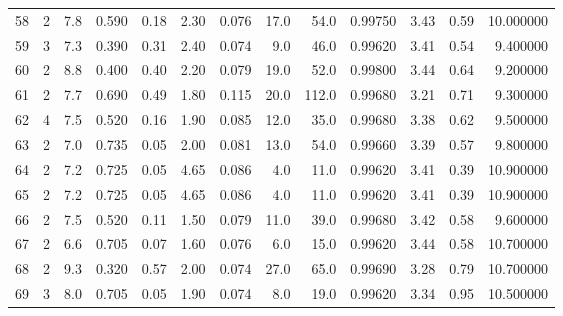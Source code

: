 \begin{tabular}{lrrrrrrrrrrrr}
58   &        2 &            7.8 &             0.590 &         0.18 &            2.30 &      0.076 &                 17.0 &                  54.0 &  0.99750 &  3.43 &       0.59 &  10.000000 \\
59   &        3 &            7.3 &             0.390 &         0.31 &            2.40 &      0.074 &                  9.0 &                  46.0 &  0.99620 &  3.41 &       0.54 &   9.400000 \\
60   &        2 &            8.8 &             0.400 &         0.40 &            2.20 &      0.079 &                 19.0 &                  52.0 &  0.99800 &  3.44 &       0.64 &   9.200000 \\
61   &        2 &            7.7 &             0.690 &         0.49 &            1.80 &      0.115 &                 20.0 &                 112.0 &  0.99680 &  3.21 &       0.71 &   9.300000 \\
62   &        4 &            7.5 &             0.520 &         0.16 &            1.90 &      0.085 &                 12.0 &                  35.0 &  0.99680 &  3.38 &       0.62 &   9.500000 \\
63   &        2 &            7.0 &             0.735 &         0.05 &            2.00 &      0.081 &                 13.0 &                  54.0 &  0.99660 &  3.39 &       0.57 &   9.800000 \\
64   &        2 &            7.2 &             0.725 &         0.05 &            4.65 &      0.086 &                  4.0 &                  11.0 &  0.99620 &  3.41 &       0.39 &  10.900000 \\
65   &        2 &            7.2 &             0.725 &         0.05 &            4.65 &      0.086 &                  4.0 &                  11.0 &  0.99620 &  3.41 &       0.39 &  10.900000 \\
66   &        2 &            7.5 &             0.520 &         0.11 &            1.50 &      0.079 &                 11.0 &                  39.0 &  0.99680 &  3.42 &       0.58 &   9.600000 \\
67   &        2 &            6.6 &             0.705 &         0.07 &            1.60 &      0.076 &                  6.0 &                  15.0 &  0.99620 &  3.44 &       0.58 &  10.700000 \\
68   &        2 &            9.3 &             0.320 &         0.57 &            2.00 &      0.074 &                 27.0 &                  65.0 &  0.99690 &  3.28 &       0.79 &  10.700000 \\
69   &        3 &            8.0 &             0.705 &         0.05 &            1.90 &      0.074 &                  8.0 &                  19.0 &  0.99620 &  3.34 &       0.95 &  10.500000 \\

\end{tabular}
